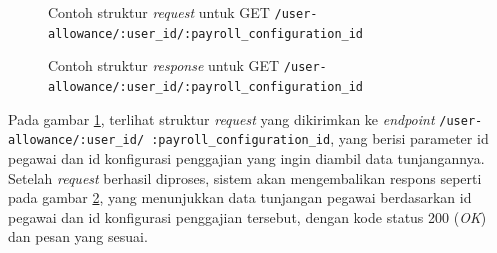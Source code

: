 \begin{figure}
    \centering
    \caption{Contoh struktur \textit{request} untuk GET \texttt{/user-allowance/{:user\_id}/{:payroll\_configuration\_id}}}
    \label{fig:request_user_allowance_by_user_id_and_payroll_configuration_id_get}
\end{figure}
\begin{figure}
    \centering
    \caption{Contoh struktur \textit{response} untuk GET \texttt{/user-allowance/{:user\_id}/{:payroll\_configuration\_id}}}
    \label{fig:response_user_allowance_by_user_id_and_payroll_configuration_id_get}
\end{figure}
Pada gambar \ref{fig:request_user_allowance_by_user_id_and_payroll_configuration_id_get}, terlihat struktur \textit{request} yang dikirimkan ke \textit{endpoint} \texttt{/user-allowance/{:user\_id}/ {:payroll\_configuration\_id}}, yang berisi parameter id pegawai dan id konfigurasi penggajian yang ingin diambil data tunjangannya. Setelah \textit{request} berhasil diproses, sistem akan mengembalikan respons seperti pada gambar \ref{fig:response_user_allowance_by_user_id_and_payroll_configuration_id_get}, yang menunjukkan data tunjangan pegawai berdasarkan id pegawai dan id konfigurasi penggajian tersebut, dengan kode status 200 (\textit{OK}) dan pesan yang sesuai.

